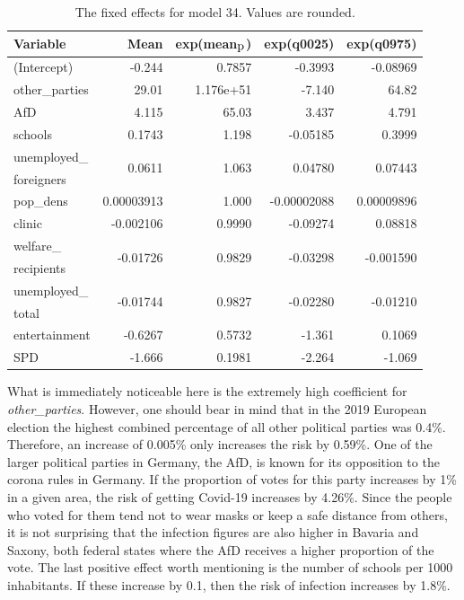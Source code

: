 \begin{table}[H] 
\caption{The fixed effects for model 34. Values are rounded. \label{allGermanyLeroux}}
\begin{tabular}{l r r r r}
\toprule
\textbf{Variable}	& \textbf{Mean}	& \textbf{exp(mean$_{\hbox{p}}$)} & \textbf{exp(q0025)} & \textbf{exp(q0975)} \\
\midrule
(Intercept) & -0.244 & 0.7857 & -0.3993 & -0.08969\\
other\_parties & 29.01 & 1.176e+51  & -7.140  & 64.82 \\
AfD & 4.115 & 65.03 & 3.437 & 4.791\\
schools & 0.1743 & 1.198 & -0.05185 & 0.3999\\
unemployed\_ & \multirow{2}{*}{0.0611} & \multirow{2}{*}{1.063} & \multirow{2}{*}{0.04780} & \multirow{2}{*}{0.07443}\\
foreigners \\
pop\_dens & 0.00003913 & 1.000 & -0.00002088 & 0.00009896\\
clinic & -0.002106 & 0.9990 & -0.09274 & 0.08818\\
welfare\_ & \multirow{2}{*}{-0.01726} & \multirow{2}{*}{0.9829} & \multirow{2}{*}{-0.03298} & \multirow{2}{*}{-0.001590}\\
recipients \\
unemployed\_ & \multirow{2}{*}{-0.01744} & \multirow{2}{*}{0.9827} & \multirow{2}{*}{-0.02280} & \multirow{2}{*}{-0.01210}\\
total \\
entertainment & -0.6267 & 0.5732 & -1.361 & 0.1069\\
SPD & -1.666 & 0.1981  & -2.264 & -1.069\\
\bottomrule
\end{tabular}
\end{table}
What is immediately noticeable here is the extremely high coefficient for \textit{other\_parties}. However, one should bear in mind that in the 2019 European election the highest combined percentage of all other political parties was 0.4\%. Therefore, an increase of 0.005\% only increases the risk by 0.59\%. One of the larger political parties in Germany, the AfD, is known for its opposition to the corona rules in Germany. If the proportion of votes for this party increases by 1\% in a given area, the risk of getting Covid-19 increases by 4.26\%. Since the people who voted for them tend not to wear masks or keep a safe distance from others, it is not surprising that the infection figures are also higher in Bavaria and Saxony, both federal states where the AfD receives a higher proportion of the vote. The last positive effect worth mentioning is the number of schools per 1000 inhabitants. If these increase by 0.1, then the risk of infection increases by 1.8\%.

